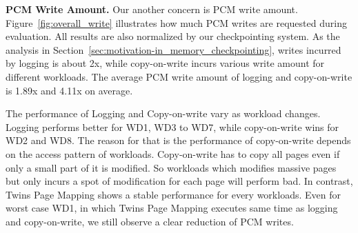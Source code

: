 \documentclass[conference]{IEEEtran}
\begin{document}


\textbf{PCM Write Amount.}
Our another concern is PCM write amount.
Figure~\ref{fig:overall_write} illustrates how much PCM writes are requested during evaluation.
All results are also normalized by our checkpointing system.
As the analysis in Section~\ref{sec:motivation-in_memory_checkpointing}, writes incurred by logging is about 2x, while copy-on-write incurs various write amount for different workloads.
The average PCM write amount of logging and copy-on-write is 1.89x and 4.11x on average.

The performance of Logging and Copy-on-write vary as workload changes.
Logging performs better for WD1, WD3 to WD7, while copy-on-write wins for WD2 and WD8.
The reason for that is the performance of copy-on-write depends on the access pattern of workloads.
Copy-on-write has to copy all pages even if only a small part of it is modified.
So workloads which modifies massive pages but only incurs a spot of modification for each page will perform bad.
In contrast, Twins Page Mapping shows a stable performance for every workloads.
Even for worst case WD1, in which Twins Page Mapping executes same time as logging and copy-on-write, we still observe a clear reduction of PCM writes.

\end{document}

